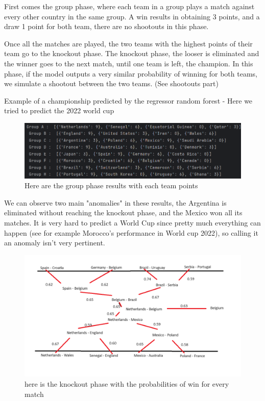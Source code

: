 First comes the group phase, where each team in a group plays a match against every other country in the same group. A win results in obtaining 3 points, and a draw 1 point for both team, there are no shootouts in this phase.

Once all the matches are played, the two teams with the highest points of their team go to the knockout phase. 
The knockout phase, the looser is eliminated and the winner goes to the next match, until one team is left, the champion.
In this phase, if the model outputs a very similar probability of winning for both teams, we simulate a shootout between the two teams. (See shootouts part)

Example of a championship predicted by the regressor random forest -
Here we tried to predict the 2022 world cup
\begin{figure}[h]
  \centering
  \includegraphics[width=0.8\linewidth]{cdmGroupPhase.png}
  \caption{Here are the group phase results with each team points}
\end{figure}

We can observe two main "anomalies" in these results, the Argentina is eliminated without reaching the knockout phase, and the Mexico won all its matches.
It is very hard to predict a World Cup since pretty much everything can happen (see for example Morocco's performance in World cup 2022), so calling it an anomaly isn't very pertinent.

\begin{figure}[h]
  \centering
  \includegraphics[width=0.8\linewidth]{championshipPaint.png}
  \caption{here is the knockout phase with the probabilities of win for every match}
\end{figure}


